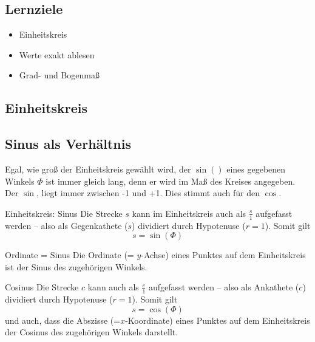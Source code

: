 \subsection*{Lernziele}

\begin{itemize}
\item Einheitskreis
\item Werte exakt ablesen
\item Grad- und Bogenmaß
\end{itemize}

\newpage
\subsection{Einheitskreis}

\TRAINER{\einheitskreis{}}

\subsection{Sinus als Verhältnis}
Egal, wie groß der Einheitskreis gewählt wird, der $\sin()$ eines
gegebenen Winkels $\Phi$ ist immer gleich lang, denn er wird im Maß
des Kreises angegeben. Der $\sin{}$, liegt immer zwischen -1 und
+1. Dies stimmt auch für den $\cos{}$.

\begin{gesetz}{Einheitskreis: Sinus}{}
  Die Strecke $s$ kann im Einheitskreis auch als $\frac{s}1$ aufgefasst werden -- also
  als Gegenkathete ($s$) dividiert durch Hypotenuse ($r=1$). Somit
  gilt
  $$s = \sin(\Phi)$$
\end{gesetz}

\begin{bemerkung}{Ordinate = Sinus}{}
  Die Ordinate (= $y$-Achse) eines Punktes auf dem Einheitskreis ist
  der Sinus des zugehörigen Winkels.
\end{bemerkung}

\begin{bemerkung}{Cosinus}{}
  Die Strecke $c$ kann auch als $\frac{c}1$ aufgefasst werden -- also
  als Ankathete ($c$) dividiert durch Hypotenuse ($r=1$). Somit
  gilt
  $$s = \cos(\Phi)$$
  und auch, dass die Abszisse (=$x$-Koordinate) eines Punktes auf dem
  Einheitskreis der Cosinus des zugehörigen Winkels darstellt.
\end{bemerkung}


